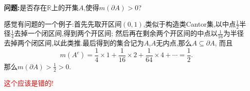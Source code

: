 \documentclass[12pt,a4paper,oneside]{ctexart}
\newcommand{\ptl}{\partial}
\newcommand{\R}{\mathbb{R}}
\begin{document}
  \textbf{问题:}是否存在$\R$上的开集$A$,使得$m(\ptl A)>0$?

  感觉有问题的一个例子:首先先取开区间$(0,1)$,类似于构造类Cantor集,以中点$\frac{1}{2}$半径$\frac{1}{4}$去掉一个闭区间,得到两个开区间;
  然后再在剩余两个开区间的中点以$\frac{1}{16}$为半径去掉两个闭区间,以此类推.最后得到的集合记为$A$,$A$无内点,那么$A\subseteq \ptl A$,
  而且
  \begin{equation*}
    m(A^c)=\frac{1}{4}\times 1+\frac{1}{16}\times 2+\frac{1}{64}\times 4+\cdots=\frac{1}{2}.
  \end{equation*}
  那么$m(\ptl A)>\frac{1}{2}>0$.

  \textcolor{red}{这个应该是错的!}
\end{document}

